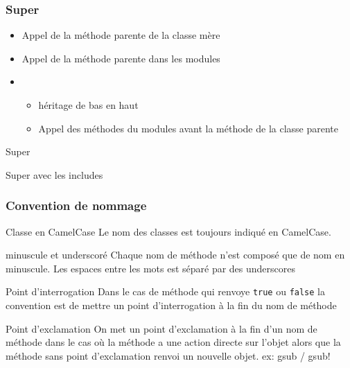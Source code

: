 \documentclass{beamer}
\begin{document}
\begin{frame}
  \frametitle{Super}
  \begin{itemize}
    \item Appel de la m\'ethode parente de la classe mère
    \item Appel de la m\'ethode parente dans les modules
    \item
      \begin{itemize}
        \item h\'eritage de bas en haut
        \item Appel des m\'ethodes du modules avant la m\'ethode de la classe parente
      \end{itemize}
  \end{itemize}
\end{frame}

\begin{frame}
  \begin{beamerboxesrounded}{Super}
    
  \end{beamerboxesrounded}
\end{frame}

\begin{frame}
  \begin{beamerboxesrounded}{Super avec les includes}
    
  \end{beamerboxesrounded}
\end{frame}

\begin{frame}
  \frametitle{Convention de nommage}
  \begin{block}{Classe en CamelCase}
    Le nom des classes est toujours indiqu\'e en CamelCase.
  \end{block}
  \begin{block}{minuscule et underscor\'e}
    Chaque nom de m\'ethode n'est compos\'e que de nom en minuscule. Les espaces entre les mots est s\'epar\'e par des underscores
  \end{block}
\end{frame}

\begin{frame}
  \begin{block}{Point d'interrogation}
    Dans le cas de m\'ethode qui renvoye \verb?true? ou \verb?false? la convention est de mettre un point d'interrogation à la fin du nom de m\'ethode
  \end{block}
  \begin{block}{Point d'exclamation}
    On met un point d'exclamation à la fin d'un nom de m\'ethode dans le cas où la m\'ethode a une action directe sur l'objet alors que la m\'ethode sans point d'exclamation renvoi un nouvelle objet. ex: gsub / gsub!
  \end{block}
\end{frame}
\end{document}

